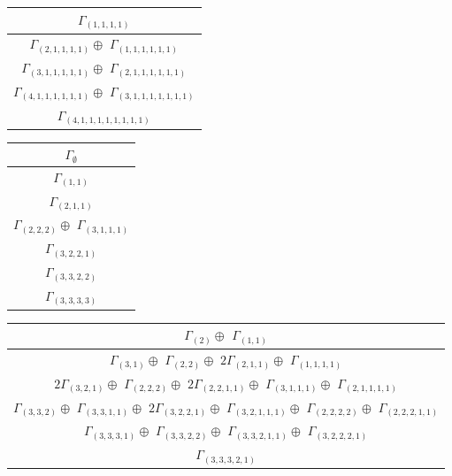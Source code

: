 \documentclass[main.tex]{subfiles}
\begin{document}
\begin{minipage}{.4\textwidth}
\centering
\begin{tabular}{c}
$\Gamma_{(
1 , 
1 , 
1 , 
1
)}$
\\ \hline
$\Gamma_{(
2 , 
1 , 
1 , 
1 , 
1
)} \oplus$
$\Gamma_{(
1 , 
1 , 
1 , 
1 , 
1 , 
1
)}$
\\ \hline
$\Gamma_{(
3 , 
1 , 
1 , 
1 , 
1 , 
1
)} \oplus$
$\Gamma_{(
2 , 
1 , 
1 , 
1 , 
1 , 
1 , 
1
)}$
\\ \hline
$\Gamma_{(
4 , 
1 , 
1 , 
1 , 
1 , 
1 , 
1
)} \oplus$
$\Gamma_{(
3 , 
1 , 
1 , 
1 , 
1 , 
1 , 
1 , 
1
)}$
\\ \hline
$\Gamma_{(
4 , 
1 , 
1 , 
1 , 
1 , 
1 , 
1 , 
1 , 
1
)}$
\\
\end{tabular}\end{minipage}
\bigskip
\begin{minipage}{.3\textwidth}
\centering
\begin{tabular}{c}
$\Gamma_\emptyset$
\\ \hline
$\Gamma_{(
1 , 
1
)}$
\\ \hline
$\Gamma_{(
2 , 
1 , 
1
)}$
\\ \hline
$\Gamma_{(
2 , 
2 , 
2
)} \oplus$
$\Gamma_{(
3 , 
1 , 
1 , 
1
)}$
\\ \hline
$\Gamma_{(
3 , 
2 , 
2 , 
1
)}$
\\ \hline
$\Gamma_{(
3 , 
3 , 
2 , 
2
)}$
\\ \hline
$\Gamma_{(
3 , 
3 , 
3 , 
3
)}$
\\
\end{tabular}\end{minipage}
\begin{minipage}{.7\textwidth}
\centering
\begin{tabular}{c}
$\Gamma_{(
2
)} \oplus$
$\Gamma_{(
1 , 
1
)}$
\\ \hline
$\Gamma_{(
3 , 
1
)} \oplus$
$\Gamma_{(
2 , 
2
)} \oplus$
$ 2 \Gamma_{(
2 , 
1 , 
1
)} \oplus$
$\Gamma_{(
1 , 
1 , 
1 , 
1
)}$
\\ \hline
$ 2 \Gamma_{(
3 , 
2 , 
1
)} \oplus$
$\Gamma_{(
2 , 
2 , 
2
)} \oplus$
$ 2 \Gamma_{(
2 , 
2 , 
1 , 
1
)} \oplus$
$\Gamma_{(
3 , 
1 , 
1 , 
1
)} \oplus$
$\Gamma_{(
2 , 
1 , 
1 , 
1 , 
1
)}$
\\ \hline
$\Gamma_{(
3 , 
3 , 
2
)} \oplus$
$\Gamma_{(
3 , 
3 , 
1 , 
1
)} \oplus$
$ 2 \Gamma_{(
3 , 
2 , 
2 , 
1
)} \oplus$
$\Gamma_{(
3 , 
2 , 
1 , 
1 , 
1
)} \oplus$
$\Gamma_{(
2 , 
2 , 
2 , 
2
)} \oplus$
$\Gamma_{(
2 , 
2 , 
2 , 
1 , 
1
)}$
\\ \hline
$\Gamma_{(
3 , 
3 , 
3 , 
1
)} \oplus$
$\Gamma_{(
3 , 
3 , 
2 , 
2
)} \oplus$
$\Gamma_{(
3 , 
3 , 
2 , 
1 , 
1
)} \oplus$
$\Gamma_{(
3 , 
2 , 
2 , 
2 , 
1
)}$
\\ \hline
$\Gamma_{(
3 , 
3 , 
3 , 
2 , 
1
)}$
\\
\end{tabular}\end{minipage}
\end{document}
